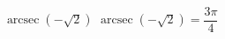  {$\operatorname{arcsec} \left( -\sqrt{2} \right)$ }
{ $\operatorname{arcsec} \left( -\sqrt{2} \right) = \dfrac{3\pi}{4}$ }
